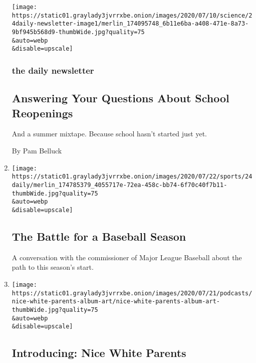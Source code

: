 \begin{enumerate}
  \texttt{[image: https://static01.graylady3jvrrxbe.onion/images/2020/07/10/science/24daily-newsletter-image1/merlin\_174095748\_6b11e6ba-a408-471e-8a73-9bf945b568d9-thumbWide.jpg?quality=75\\\&auto=webp\\\&disable=upscale]}

  \hypertarget{the-daily-newsletter-1}{%
  \subsubsection{the daily newsletter}\label{the-daily-newsletter-1}}

  \hypertarget{answering-your-questions-about-school-reopenings}{%
  \subsection{Answering Your Questions About School
  Reopenings}\label{answering-your-questions-about-school-reopenings}}

  And a summer mixtape. Because school hasn't started just yet.

  By Pam Belluck
\item
  \href{/2020/07/24/podcasts/the-daily/mlb-baseball-season-coronavirus.html}{}

  \texttt{[image: https://static01.graylady3jvrrxbe.onion/images/2020/07/22/sports/24daily/merlin\_174785379\_4055717e-72ea-458c-bb74-6f70c40f7b11-thumbWide.jpg?quality=75\\\&auto=webp\\\&disable=upscale]}

  \hypertarget{the-battle-for-a-baseball-season}{%
  \subsection{The Battle for a Baseball
  Season}\label{the-battle-for-a-baseball-season}}

  A conversation with the commissioner of Major League Baseball about
  the path to this season's start.
\item
  \href{/2020/07/23/podcasts/nice-white-parents-serial.html}{}

  \texttt{[image: https://static01.graylady3jvrrxbe.onion/images/2020/07/21/podcasts/nice-white-parents-album-art/nice-white-parents-album-art-thumbWide.jpg?quality=75\\\&auto=webp\\\&disable=upscale]}

  \hypertarget{introducing-nice-white-parents}{%
  \subsection{Introducing: Nice White
  Parents}\label{introducing-nice-white-parents}}


\end{enumerate}
